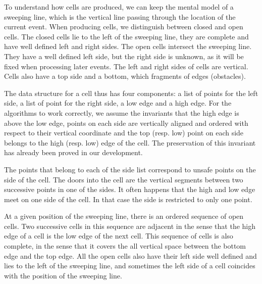 \documentclass{easychair}
\begin{document}
To understand how cells are produced, we can keep the mental model of a
sweeping line, which is the vertical line passing through the location 
of the current event.
When producing cells, we distinguish between closed and open cells.
The closed cells lie to the left of the sweeping line, they are
complete and have well defined left and right sides.  The open cells
intersect the sweeping line.  They have a well defined left side,
but the right side is unknown, as it will be fixed when
processing later events.
The left and right sides of cells are vertical.  Cells also have a top
side and a bottom, which fragments of edges (obstacles).

The data structure for a cell thus has four components: a list of
points for the left side, a list of point for the right side, a low
edge and a high edge.  For the algorithms to work correctly, we assume
the invariants that the high edge is above the low edge, points on
each side are vertically aligned and ordered with respect to their
vertical coordinate and the top (resp. low) point on each side belongs
to the high (resp. low) edge of the cell.  The preservation of this
invariant has already been proved in our development.

The points that belong to each of the side list correspond to unsafe
points on the side of the cell.  The doors into the cell are the
vertical segments between two successive points in one of the sides.
It often happens that the high and low edge meet on one side of the
cell.  In that case the side is restricted to only one point.


At a given position of the sweeping line, there is an ordered sequence
of open cells.  Two successive cells in this sequence are adjacent in
the sense that the high edge of a cell is the low edge of the next
cell.  This sequence of cells is also complete, in the sense that it
covers the all vertical space between the bottom edge and the top
edge.  All the open cells also have their left side well defined and
lies to the left of the sweeping line, and sometimes the left side of
a cell coincides with the position of the sweeping line.
\end{document}
